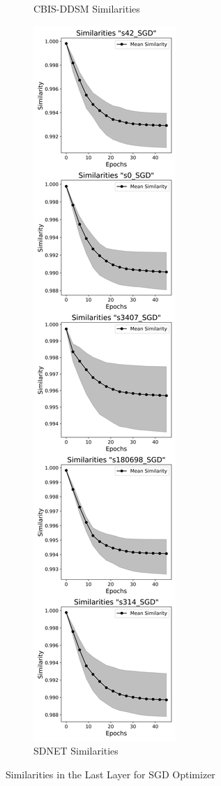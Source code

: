 \begin{figure}[h!]
\begin{subfigure}[b]{0.3\textwidth}
        \caption{CBIS-DDSM Similarities}
        \label{fig:cbisddsm_sgd}
      \end{subfigure}
      \hfill
      \begin{subfigure}[b]{0.3\textwidth}
        \includegraphics[width=\textwidth]{figures/crack_similarities_SGD_V2.png}
        \caption{SDNET Similarities}
        \label{fig:sdnet_sgd}
      \end{subfigure}
      \caption{Similarities in the Last Layer for SGD Optimizer}
      \label{fig:similarities_sgd}
\end{figure}


